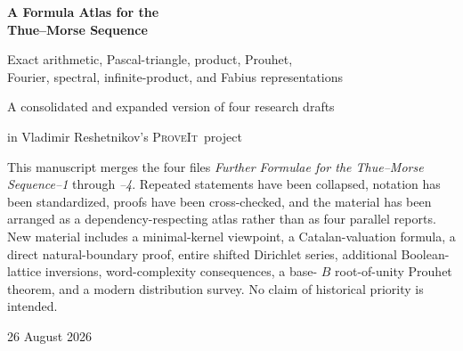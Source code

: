 \documentclass[11pt,oneside]{article}
\numberwithin{equation}{section}
\theoremstyle{definition}
\theoremstyle{remark}
\newcommand{\wt}{\operatorname{wt}}
\newcommand{\eps}{\varepsilon}
\newcommand{\TM}{\tau}
\newcommand{\repo}{\textsc{ProveIt}}
\begin{document}

\begin{titlepage}
\centering
\vspace*{2.2cm}
{\Huge\bfseries\color{AtlasBlue} A Formula Atlas for the\\[0.25em] Thue--Morse Sequence\par}
\vspace{1cm}
{\Large Exact arithmetic, Pascal-triangle, product, Prouhet,\\
Fourier, spectral, infinite-product, and Fabius representations\par}
\vspace{1.5cm}
{\large A consolidated and expanded version of four research drafts\par}
\vspace{0.4cm}
{\large in Vladimir Reshetnikov's \repo\ project\par}
\vfill
\begin{minipage}{0.82\textwidth}
\small
This manuscript merges the four files \emph{Further Formulae for the
Thue--Morse Sequence--1} through \emph{--4}.  Repeated statements have been
collapsed, notation has been standardized, proofs have been cross-checked,
and the material has been arranged as a dependency-respecting atlas rather
than as four parallel reports.  New material includes a minimal-kernel
viewpoint, a Catalan-valuation formula, a direct natural-boundary proof,
entire shifted Dirichlet series, additional Boolean-lattice inversions,
word-complexity consequences, a base-
\(B\) root-of-unity Prouhet theorem, and a modern distribution survey.
No claim of historical priority is intended.
\end{minipage}
\vfill
{\large 26 August 2026\par}
\end{titlepage}

\begin{abstract}
Let \(\TM(n)=\wt(n)\bmod 2\) be the zero--one Thue--Morse bit and
\(\eps_n=(-1)^{\wt(n)}=1-2\TM(n)\) its signed form.  Almost every useful
formula becomes transparent after moving among five equivalent objects:
binary digit parity, a character of the Boolean cube, the finite product
\(\prod_{j<m}(1-z^{2^j})\), the substitution \(0\mapsto01,1\mapsto10\),
and a mixed finite-difference operator.  The purpose of this document is to
make those translations explicit and reusable.  It develops arithmetic and
Pascal identities, exact prefix discrepancy, valuation recurrences, partition
and determinant formulas, Prouhet cancellation and all-order moments,
ordinary and Walsh Fourier transforms, Riesz products and autocorrelation,
Mahler functions, Dirichlet and product transforms, finite-state and word
combinatorics, base-\(B\) extensions, and the discrete bridge to the Fabius
function.  Results imported from the literature are labelled as such; all
other displayed identities are proved or reduced to a previously proved
identity in the text.
\end{abstract}
\end{document}
